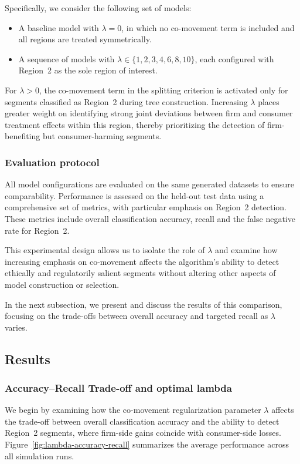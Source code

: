 \documentclass[11pt,letterpaper,english]{article}
\theoremstyle{definition}
\theoremstyle{definition}
\begin{document}
\begin{bibunit}
Specifically, we consider the following set of models:
\begin{itemize}
    \item A baseline model with $\lambda = 0$, in which no co-movement term is included and all regions are treated symmetrically.
    \item A sequence of models with $\lambda \in \{1, 2, 3, 4, 6, 8, 10\}$, each configured with Region~2 as the sole region of interest.
\end{itemize}

For $\lambda > 0$, the co-movement term in the splitting criterion is activated only for segments classified as Region~2 during tree construction. Increasing $\lambda$ places greater weight on identifying strong joint deviations between firm and consumer treatment effects within this region, thereby prioritizing the detection of firm-benefiting but consumer-harming segments.

\subsubsection{Evaluation protocol}

All model configurations are evaluated on the same generated datasets to ensure comparability. Performance is assessed on the held-out test data using a comprehensive set of metrics, with particular emphasis on Region~2 detection. These metrics include overall classification accuracy,  recall and the false negative rate for Region~2.

This experimental design allows us to isolate the role of $\lambda$ and examine how increasing emphasis on co-movement affects the algorithm’s ability to detect ethically and regulatorily salient segments without altering other aspects of model construction or selection.

In the next subsection, we present and discuss the results of this comparison, focusing on the trade-offs between overall accuracy and targeted recall as $\lambda$ varies.

\subsection{Results}
\label{sec:lambda-results}
\subsubsection{Accuracy--Recall Trade-off and optimal lambda}
We begin by examining how the co-movement regularization parameter $\lambda$ affects the trade-off between overall classification accuracy and the ability to detect Region~2 segments, where firm-side gains coincide with consumer-side losses. Figure~\ref{fig:lambda-accuracy-recall} summarizes the average performance across all simulation runs.


\end{bibunit}
\end{document}
